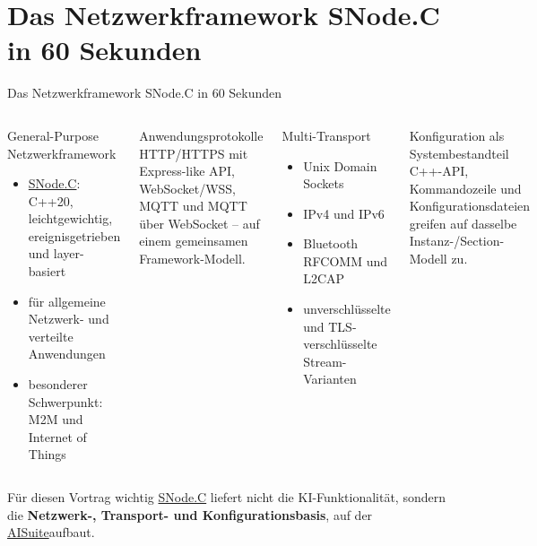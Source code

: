\documentclass[\fhformat,10pt]{fh-ooe}
\newcommand{\SNodeCLink}{\href{https://github.com/SNodeC/snode.c}{SNode.C}}
\newcommand{\AISuiteLink}{\href{https://github.com/SNodeC/AISuite}{AISuite}}
\begin{document}
\section{Das Netzwerkframework SNode.C in 60 Sekunden}
\begin{frame}{Das Netzwerkframework SNode.C in 60 Sekunden}
\small
\begin{columns}[T]
\begin{block}{General-Purpose Netzwerkframework}
\begin{itemize}
  \item \SNodeCLink: C++20, leichtgewichtig, ereignisgetrieben und layer-basiert
  \item für allgemeine Netzwerk- und verteilte Anwendungen
  \item besonderer Schwerpunkt: M2M und Internet of Things
\end{itemize}
\end{block}
\begin{block}{Anwendungsprotokolle}
HTTP/HTTPS mit Express-like API, WebSocket/WSS, MQTT und MQTT über WebSocket -- auf einem gemeinsamen Framework-Modell.
\end{block}
\begin{block}{Multi-Transport}
\begin{itemize}
  \item Unix Domain Sockets
  \item IPv4 und IPv6
  \item Bluetooth RFCOMM und L2CAP
  \item unverschlüsselte und TLS-verschlüsselte Stream-Varianten
\end{itemize}
\end{block}
\begin{block}{Konfiguration als Systembestandteil}
C++-API, Kommandozeile und Konfigurationsdateien greifen auf dasselbe Instanz-/Section-Modell zu.
\end{block}
\end{columns}
\vspace{0.15em}
\begin{alertblock}{Für diesen Vortrag wichtig}
\SNodeCLink{} liefert nicht die KI-Funktionalität, sondern die \textbf{Netzwerk-, Transport- und Konfigurationsbasis}, auf der \AISuiteLink aufbaut.
\end{alertblock}
\end{frame}

\end{document}
